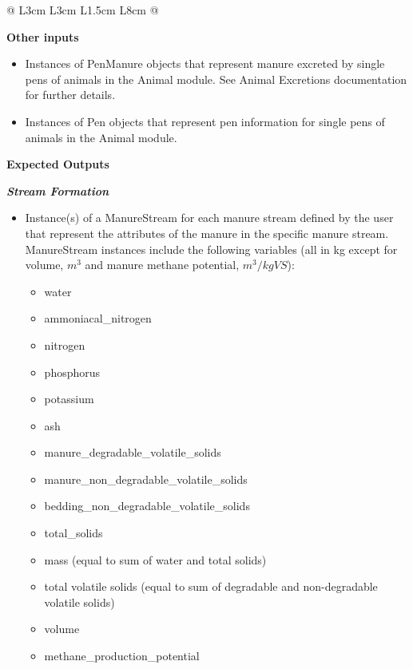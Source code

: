 \begin{refsection}
\begin{longtable}{@{} L{3cm} L{3cm} L{1.5cm} L{8cm} @{}}
\end{longtable}


\textbf{Other inputs}\\

\begin{itemize}
\item Instances of PenManure objects that represent manure excreted by single pens of animals in the Animal module. See Animal Excretions documentation for further details. 
\item Instances of Pen objects that represent pen information for single pens of animals in the Animal module.
\end{itemize}

\vspace{0.3cm}

\textbf{Expected Outputs}
\vspace{ 0.25cm}

\textbf{\textit{Stream Formation}}
\begin{itemize}
    \item Instance(s) of a ManureStream for each manure stream defined by the user that represent the attributes of the manure in the specific manure stream. ManureStream instances include the following variables (all in kg except for volume, \(m^3\) and manure methane potential, \(m^3 / kgVS\)):
    \begin{itemize}
        \item water 
        \item ammoniacal\_nitrogen
        \item nitrogen 
        \item phosphorus
        \item potassium
        \item ash
        \item manure\_degradable\_volatile\_solids
        \item manure\_non\_degradable\_volatile\_solids
        \item bedding\_non\_degradable\_volatile\_solids
        \item total\_solids
        \item mass (equal to sum of water and total solids)
        \item total volatile solids (equal to sum of degradable and non-degradable volatile solids)
        \item volume
        \item methane\_production\_potential

    \end{itemize}


\end{itemize}
\end{refsection}
